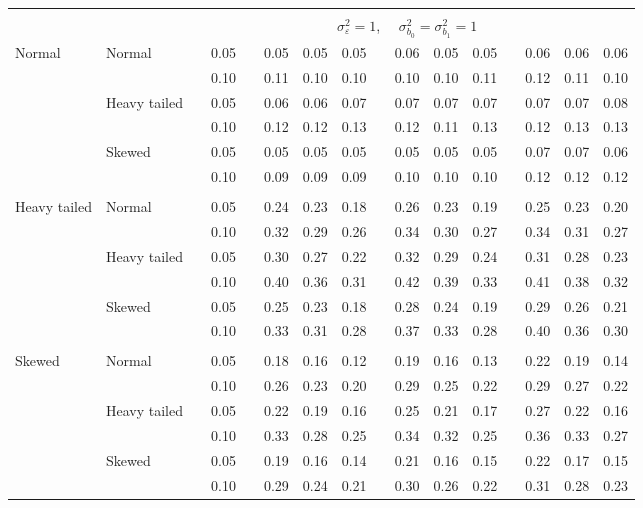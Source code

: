 \documentclass{article} %
\begin{document}
\begin{table}[ht]
\begin{scriptsize}
\begin{center}
\begin{tabular}{ll p{.1cm} c p{.1cm} rrr p{.1cm} rrr p{.1cm} rrr}
&&&&&&&&&&&&&&&\\
& && && \multicolumn{9}{c}{$\sigma_{\varepsilon}^2 = 1$, \ \ $\sigma_{b_0}^2 = \sigma_{b_1}^2 = 1$} \\ \cline{6-16}
\rowcolor{gray!20}Normal       & Normal       && 0.05 &&   0.05 & 0.05 & 0.05 && 0.06 & 0.05 & 0.05 &&  0.06 & 0.06 & 0.06 \\
\rowcolor{gray!20}             &              && 0.10 &&   0.11 & 0.10 & 0.10 && 0.10 & 0.10 & 0.11 &&  0.12 & 0.11 & 0.10 \\
\rowcolor{gray!20}             & Heavy tailed && 0.05 &&   0.06 & 0.06 & 0.07 && 0.07 & 0.07 & 0.07 &&  0.07 & 0.07 & 0.08 \\
\rowcolor{gray!20}             &              && 0.10 &&   0.12 & 0.12 & 0.13 && 0.12 & 0.11 & 0.13 &&  0.12 & 0.13 & 0.13 \\
\rowcolor{gray!20}             & Skewed       && 0.05 &&   0.05 & 0.05 & 0.05 && 0.05 & 0.05 & 0.05 &&  0.07 & 0.07 & 0.06 \\
\rowcolor{gray!20}             &              && 0.10 &&   0.09 & 0.09 & 0.09 && 0.10 & 0.10 & 0.10 &&  0.12 & 0.12 & 0.12 \\
             &&&&&&&&&&&&&&&\\
Heavy tailed & Normal       && 0.05 &&   0.24 & 0.23 & 0.18 && 0.26 & 0.23 & 0.19 &&  0.25 & 0.23 & 0.20 \\
             &              && 0.10 &&   0.32 & 0.29 & 0.26 && 0.34 & 0.30 & 0.27 &&  0.34 & 0.31 & 0.27 \\
             & Heavy tailed && 0.05 &&   0.30 & 0.27 & 0.22 && 0.32 & 0.29 & 0.24 &&  0.31 & 0.28 & 0.23 \\
             &              && 0.10 &&   0.40 & 0.36 & 0.31 && 0.42 & 0.39 & 0.33 &&  0.41 & 0.38 & 0.32 \\
             & Skewed       && 0.05 &&   0.25 & 0.23 & 0.18 && 0.28 & 0.24 & 0.19 &&  0.29 & 0.26 & 0.21 \\
             &              && 0.10 &&   0.33 & 0.31 & 0.28 && 0.37 & 0.33 & 0.28 &&  0.40 & 0.36 & 0.30 \\
             &&&&&&&&&&&&&&&\\
Skewed       & Normal       && 0.05 &&   0.18 & 0.16 & 0.12 && 0.19 & 0.16 & 0.13 &&  0.22 & 0.19 & 0.14 \\
             &              && 0.10 &&   0.26 & 0.23 & 0.20 && 0.29 & 0.25 & 0.22 &&  0.29 & 0.27 & 0.22 \\
             & Heavy tailed && 0.05 &&   0.22 & 0.19 & 0.16 && 0.25 & 0.21 & 0.17 &&  0.27 & 0.22 & 0.16 \\
             &              && 0.10 &&   0.33 & 0.28 & 0.25 && 0.34 & 0.32 & 0.25 &&  0.36 & 0.33 & 0.27 \\
             & Skewed       && 0.05 &&   0.19 & 0.16 & 0.14 && 0.21 & 0.16 & 0.15 &&  0.22 & 0.17 & 0.15 \\
             &              && 0.10 &&   0.29 & 0.24 & 0.21 && 0.30 & 0.26 & 0.22 &&  0.31 & 0.28 & 0.23 \\



\end{tabular}
\end{center}
\end{scriptsize}
\end{table}
\end{document}
